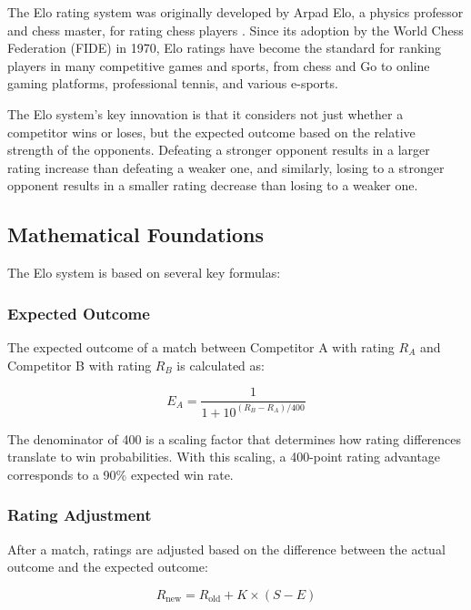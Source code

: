 \documentclass[11pt]{article}
\begin{document}
The Elo rating system was originally developed by Arpad Elo, a physics professor and chess master, for rating chess players \citep{elo1978rating}. Since its adoption by the World Chess Federation (FIDE) in 1970, Elo ratings have become the standard for ranking players in many competitive games and sports, from chess and Go to online gaming platforms, professional tennis, and various e-sports.

The Elo system's key innovation is that it considers not just whether a competitor wins or loses, but the expected outcome based on the relative strength of the opponents. Defeating a stronger opponent results in a larger rating increase than defeating a weaker one, and similarly, losing to a stronger opponent results in a smaller rating decrease than losing to a weaker one.

\subsection{Mathematical Foundations}

The Elo system is based on several key formulas:

\subsubsection{Expected Outcome}

The expected outcome of a match between Competitor A with rating $R_A$ and Competitor B with rating $R_B$ is calculated as:

\begin{equation}
E_A = \frac{1}{1 + 10^{(R_B - R_A)/400}}
\end{equation}

The denominator of 400 is a scaling factor that determines how rating differences translate to win probabilities. With this scaling, a 400-point rating advantage corresponds to a 90\% expected win rate.

\subsubsection{Rating Adjustment}

After a match, ratings are adjusted based on the difference between the actual outcome and the expected outcome:

\begin{equation}
R_{\text{new}} = R_{\text{old}} + K \times (S - E)
\end{equation}
\end{document}
